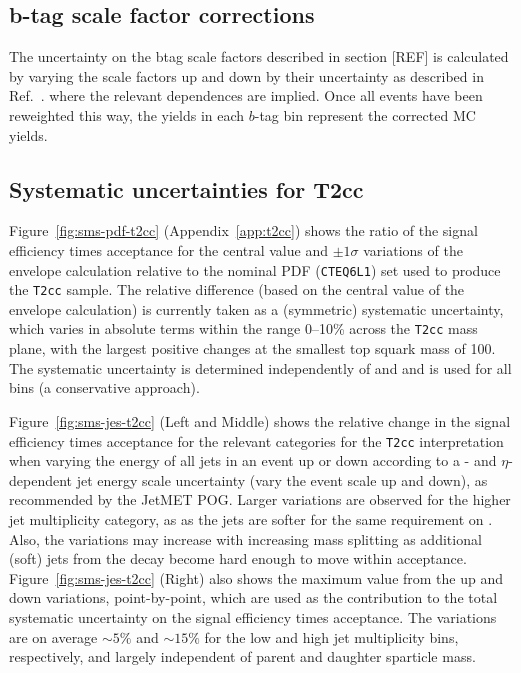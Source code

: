 \subsection{b-tag scale factor corrections\label{sec:sms-syst-btag}}

The uncertainty on the btag scale factors described in section [REF]
is calculated by varying the scale factors up and down by their
uncertainty as described in Ref.~\cite{btagpogtwiki}.
where the relevant dependences are implied. Once all events have been
reweighted this way, the yields in each $b$-tag bin represent the
corrected MC yields. 

\subsection{Systematic uncertainties for T2cc\label{sec:sms-t2cc}}

Figure~\ref{fig:sms-pdf-t2cc} (Appendix~\ref{app:t2cc}) shows the
ratio of the signal efficiency times acceptance for the central value
and $\pm1\sigma$ variations of the envelope calculation relative to
the nominal PDF (\verb!CTEQ6L1!)  set used to produce the
\texttt{T2cc} sample. The relative difference (based on the central
value of the envelope calculation) is currently taken as a (symmetric)
systematic uncertainty, which varies in absolute terms within the
range 0--10\% across the \verb!T2cc! mass plane, with the largest
positive changes at the smallest top squark mass of 100\gev. The
systematic uncertainty is determined independently of \njet and \nb
and is used for all \scalht bins (a conservative approach). 

Figure~\ref{fig:sms-jes-t2cc} (Left and Middle) shows the relative
change in the signal efficiency times acceptance for the relevant
categories for the \verb!T2cc! interpretation when varying the energy
of all jets in an event up or down according to a \pt- and
$\eta$-dependent jet energy scale uncertainty (\ie vary the event
scale up and down), as recommended by the JetMET POG. Larger
variations are observed for the higher jet multiplicity category, as
as the jets are softer for the same requirement on \scalht. Also, the
variations may increase with increasing mass splitting as additional
(soft) jets from the decay become hard enough to move within
acceptance. Figure~\ref{fig:sms-jes-t2cc} (Right) also shows the
maximum value from the up and down variations, point-by-point, which
are used as the contribution to the total systematic uncertainty on
the signal efficiency times acceptance. The variations are on average
$\sim5\%$ and $\sim15\%$ for the low and high jet multiplicity bins,
respectively, and largely independent of parent and daughter sparticle
mass. 

